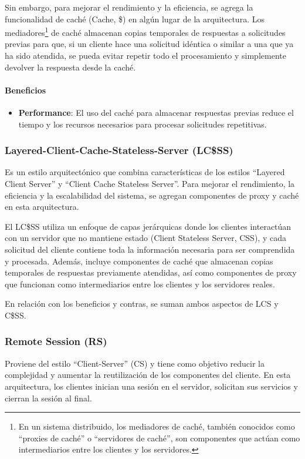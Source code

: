 \documentclass{article}
\begin{document}
		Sin embargo, para mejorar el rendimiento y la eficiencia, se agrega la funcionalidad de caché (Cache, \$) en algún lugar de la arquitectura. Los mediadores\footnote{En un sistema distribuido, los mediadores de caché, también conocidos como ``proxies de caché'' o ``servidores de caché'', son componentes que actúan como intermediarios entre los clientes y los servidores.} de caché almacenan copias temporales de respuestas a solicitudes previas para que, si un cliente hace una solicitud idéntica o similar a una que ya ha sido atendida, se pueda evitar repetir todo el procesamiento y simplemente devolver la respuesta desde la caché.
		
		\paragraph{Beneficios}
		\begin{itemize}	
			\item {\textbf{Performance}}: El uso del caché para almacenar respuestas previas reduce el tiempo y los recursos necesarios para procesar solicitudes repetitivas.
			
		\end{itemize}
		
		
		\subsubsection{Layered-Client-Cache-Stateless-Server (LC\$SS)}
		Es un estilo arquitectónico que combina características de los estilos ``Layered Client Server'' y ``Client Cache Stateless Server''. Para mejorar el rendimiento, la eficiencia y la escalabilidad del sistema, se agregan componentes de proxy y caché en esta arquitectura.
		
		El LC\$SS utiliza un enfoque de capas jerárquicas donde los clientes interactúan con un servidor que no mantiene estado (Client Stateless Server, CSS), y cada solicitud del cliente contiene toda la información necesaria para ser comprendida y procesada. Además, incluye componentes de caché que almacenan copias temporales de respuestas previamente atendidas, así como componentes de proxy que funcionan como intermediarios entre los clientes y los servidores reales.
		
		En relación con los beneficios y contras, se suman ambos aspectos de LCS y C\$SS.
		
		\subsubsection{Remote Session (RS)}
		Proviene del estilo ``Client-Server'' (CS) y tiene como objetivo reducir la complejidad y aumentar la reutilización de los componentes del cliente. En esta arquitectura, los clientes inician una sesión en el servidor, solicitan sus servicios y cierran la sesión al final.
		
\end{document}
